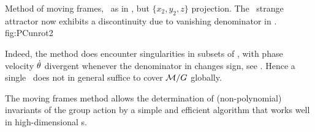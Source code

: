 \begin{description}
{}{
Method of moving frames, \slice\ as in ,
but $\{x_2,y_2,z\}$ projection. The \cLf\ strange attractor
now exhibits a discontinuity due to
vanishing denominator in .
}
{fig:PCunrot2}

Indeed, the method does encounter singularities in
subsets of \statesp, with phase velocity $\dot{{\bf \theta}}$
divergent whenever the denominator in 
changes sign, see .
Hence a single \slice\ does
not in general suffice to cover ${\cal M}/G$ globally.

%
The moving frames method allows the determination of (non-polynomial)
invariants of the group action by a simple and efficient
algorithm that works well in high-dimensional \statesp s.


\end{description}
